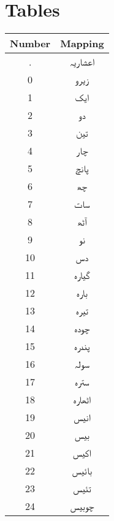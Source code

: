 \chapter{Tables}

\begin{longtable}[c]{|c|c|}
\hline
\textbf{Number} & \textbf{Mapping}    \\ \hline
\endhead
%
.               & \texturdu{اعشاریہ}  \\ \hline
0               & \texturdu{زیرو}     \\ \hline
1               & \texturdu{ایک}      \\ \hline
2               & \texturdu{دو}       \\ \hline
3               & \texturdu{تین}      \\ \hline
4               & \texturdu{چار}      \\ \hline
5               & \texturdu{پانچ}     \\ \hline
6               & \texturdu{چھ}       \\ \hline
7               & \texturdu{سات}      \\ \hline
8               & \texturdu{آٹھ}      \\ \hline
9               & \texturdu{نو}       \\ \hline
10              & \texturdu{دس}       \\ \hline
11              & \texturdu{گیارہ}    \\ \hline
12              & \texturdu{بارہ}     \\ \hline
13              & \texturdu{تیرہ}     \\ \hline
14              & \texturdu{چودہ}     \\ \hline
15              & \texturdu{پندرہ}    \\ \hline
16              & \texturdu{سولہ}     \\ \hline
17              & \texturdu{سترہ}     \\ \hline
18              & \texturdu{اٹھارہ}   \\ \hline
19              & \texturdu{انیس}     \\ \hline
20              & \texturdu{بیس}      \\ \hline
21              & \texturdu{اکیس}     \\ \hline
22              & \texturdu{بائیس}    \\ \hline
23              & \texturdu{تئیس}     \\ \hline
24              & \texturdu{چوبیس}    \\ \hline

\end{longtable}
